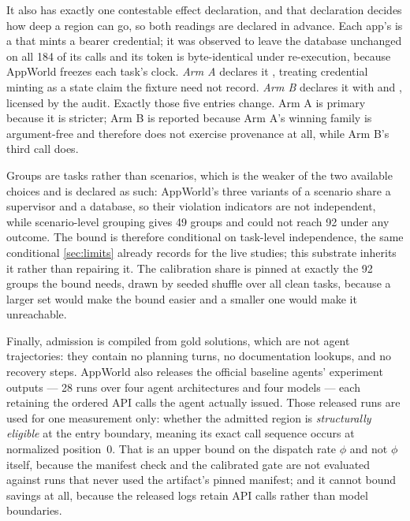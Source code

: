 It also has exactly one contestable effect declaration, and that declaration decides how deep
a region can go, so both readings are declared in advance. Each app's  is a
 that mints a bearer credential; it was observed to leave the database unchanged on
all 184 of its calls and its token is byte-identical under re-execution, because AppWorld
freezes each task's clock. \emph{Arm A} declares it , treating
credential minting as a state claim the fixture need not record. \emph{Arm B} declares it
 with  and , licensed by the audit.
Exactly those five entries change. Arm A is primary because it is stricter; Arm B is reported
because Arm A's winning family is argument-free and therefore does not exercise provenance at
all, while Arm B's third call does.

Groups are tasks rather than scenarios, which is the weaker of the two available choices and
is declared as such: AppWorld's three variants of a scenario share a supervisor and a
database, so their violation indicators are not independent, while scenario-level grouping
gives 49 groups and could not reach 92 under any outcome. The bound is therefore conditional
on task-level independence, the same conditional \cref{sec:limits} already records for the
live studies; this substrate inherits it rather than repairing it. The calibration share is
pinned at exactly the 92 groups the bound needs, drawn by seeded shuffle over all clean
tasks, because a larger set would make the bound easier and a smaller one would make it
unreachable.

Finally, admission is compiled from gold solutions, which are not agent trajectories: they
contain no planning turns, no documentation lookups, and no recovery steps. AppWorld also
releases the official baseline agents' experiment outputs --- 28 runs over four agent
architectures and four models --- each retaining the ordered API calls the agent actually
issued. Those released runs are used for one measurement only: whether the admitted region is
\emph{structurally eligible} at the entry boundary, meaning its exact call sequence occurs at
normalized position~0. That is an upper bound on the dispatch rate $\phi$ and not $\phi$
itself, because the manifest check and the calibrated gate are not evaluated against runs that
never used the artifact's pinned manifest; and it cannot bound savings at all, because the
released logs retain API calls rather than model boundaries.

